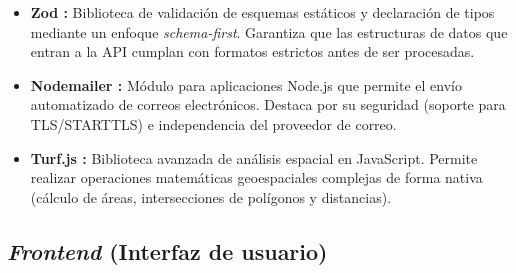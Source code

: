 \begin{itemize}
\begin{itemize}
        \item \textbf{Helmet \cite{helmet} y Express-Rate-Limit \cite{expressratelimit}:} \textit{Middlewares} de seguridad que protegen la aplicación configurando adecuadamente las cabeceras HTTP y limitando el número máximo de peticiones por IP, mitigando ataques de denegación de servicio (DDoS) y ataques de fuerza bruta.
    \end{itemize}
    \item \textbf{Zod \cite{zod}:} Biblioteca de validación de esquemas estáticos y declaración de tipos mediante un enfoque \textit{schema-first}. Garantiza que las estructuras de datos que entran a la API cumplan con formatos estrictos antes de ser procesadas.
    \item \textbf{Nodemailer \cite{nodemailer}:} Módulo para aplicaciones Node.js que permite el envío automatizado de correos electrónicos. Destaca por su seguridad (soporte para TLS/STARTTLS) e independencia del proveedor de correo.
    \item \textbf{Turf.js \cite{turfjs}:} Biblioteca avanzada de análisis espacial en JavaScript. Permite realizar operaciones matemáticas geoespaciales complejas de forma nativa (cálculo de áreas, intersecciones de polígonos y distancias).
\end{itemize}

\subsection{\textit{Frontend} (Interfaz de usuario)}

